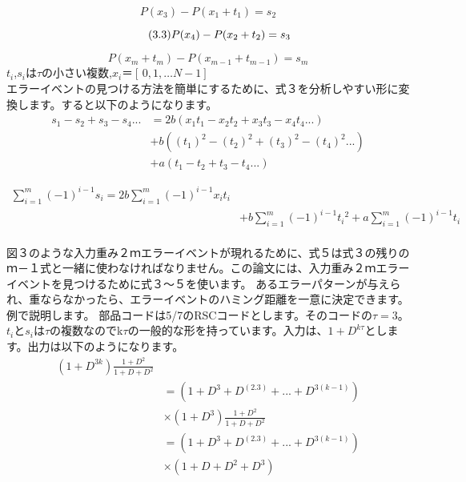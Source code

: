 \documentclass[20 pts]{article}
\begin{document}
\begin{equation}\tag{3.2}
P(x_3)-P(x_1+t_1)=s_2
\end{equation}

\begin{equation}\tag{3.3}
P(x_4)-P(x_2+t_2)=s_3\\
\end{equation}

\begin{equation}\tag{3.m}
P(x_m+t_m)-P(x_{m-1}+t_{m-1})=s_m
\end{equation}
$t_i$,$s_i$は$\tau$の小さい複数,$x_i＝[\,0,1,…N-1]\,$\\
エラーイベントの見つける方法を簡単にするために、式３を分析しやすい形に変換します。すると以下のようになります。
\begin{equation}\tag{4}
\begin{split}
s_1-s_2+s_3-s_4...&=2b(x_1t_1-x_2t_2+x_3t_3-x_4t_4...)\\
&+b((t_1)^2-(t_2)^2+(t_3)^2-(t_4)^2...)\\
&+a(t_1-t_2+t_3-t_4...)
\end{split}
\end{equation}

\begin{equation}\tag{5}
\begin{split}
\sum_{i=1}^m (-1)^{i-1}s_i=2b\sum_{i=1}^m (-1)^{i-1}x_it_i\\
&+b\sum_{i=1}^m (-1)^{i-1} {t_i}^2+a\sum_{i=1}^m (-1)^{i-1}t_i
\end{split}
\end{equation}
\paragraph{}
図３のような入力重み２ｍエラーイベントが現れるために、式５は式３の残りのｍ－１式と一緒に使わなければなりません。この論文には、入力重み２ｍエラーイベントを見つけるために式３～５を使います。
あるエラーパターンが与えられ、重ならなかったら、エラーイベントのハミング距離を一意に決定できます。例で説明します。
部品コードは5/7のRSCコードとします。そのコードの$\tau=3$。$t_i$と$s_i$は$\tau$の複数なのでk$\tau$の一般的な形を持っています。入力は、$1+D^{k\tau}$とします。出力は以下のようになります。
\begin{equation}\tag{6}
\begin{split}
(1+D^{3k})\frac{1+D^2}{1+D+D^2}\\
&=(1+D^3+D^(2.3)+...+D^{3(k-1)})\\
&\times(1+D^{3})\frac{1+D^2}{1+D+D^2}\\
&=(1+D^3+D^(2.3)+...+D^{3(k-1)})\\
&\times(1+D+D^2+D^3)
\end{split}
\end{equation}
\end{document}

